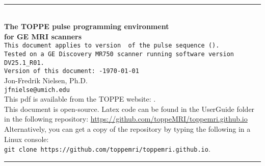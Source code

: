 

\begin{titlepage}
~\\[0.5in]
\begin{centering}
\rule{\textwidth}{5pt}
~\\[0.5in]
{\bf \huge The TOPPE pulse programming environment} \\ [0.4in]
{\bf \huge for GE MRI scanners} \\ [0.6in]
{\tt This document applies to version~\toppeversion~of the pulse sequence (\toppe).   } \\ [0.1in]
{\tt Tested on a GE Discovery MR750 scanner running software version DV25.1\_R01.   } \\ [0.6in]
{\tt Version of this document:~\toppeversion-\today} \\ [1in]
{\large Jon-Fredrik Nielsen, Ph.D.} \\ [0.1in]
{\tt jfnielse@umich.edu} \\ [1in]
This pdf is available from the TOPPE website: \toppeweb. \\ [0.25in]
This document is open-source. Latex code can be found in the UserGuide folder in the following repository: \url{https://github.com/toppeMRI/toppemri.github.io} \\
Alternatively, you can get a copy of the repository by typing the following in a Linux console:\\
{\tt git clone https://github.com/toppemri/toppemri.github.io}. \\ [0.1in]
\rule{\textwidth}{5pt}
\end{centering}
\end{titlepage}


